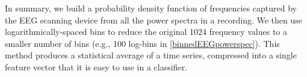 In summary, we build a probability density function of frequencies captured by the EEG scanning device from all the power spectra in a recording. We then use logarithmically-spaced bins to reduce the original 1024 frequency values to a smaller number of bins (e.g., 100 log-bins in \ref{binnedEEGpowerspec}). This method produces a statistical average of a time series, compressed into a single feature vector that it is easy to use in a classifier.





